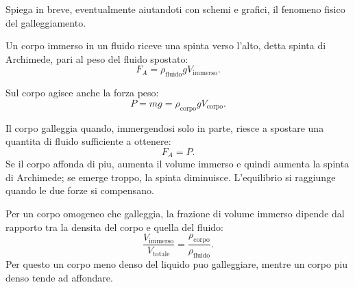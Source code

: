 
\begin{esercizio}
Spiega in breve, eventualmente aiutandoti con schemi e grafici, il fenomeno
fisico del galleggiamento.
\end{esercizio}

\begin{soluzione}
Un corpo immerso in un fluido riceve una spinta verso l'alto, detta spinta di
Archimede, pari al peso del fluido spostato:
\[
F_A=\rho_\text{fluido}gV_\text{immerso}.
\]

Sul corpo agisce anche la forza peso:
\[
P=mg=\rho_\text{corpo}gV_\text{corpo}.
\]

Il corpo galleggia quando, immergendosi solo in parte, riesce a spostare una
quantita di fluido sufficiente a ottenere:
\[
F_A=P.
\]
Se il corpo affonda di piu, aumenta il volume immerso e quindi aumenta la
spinta di Archimede; se emerge troppo, la spinta diminuisce. L'equilibrio si
raggiunge quando le due forze si compensano.

Per un corpo omogeneo che galleggia, la frazione di volume immerso dipende dal
rapporto tra la densita del corpo e quella del fluido:
\[
\frac{V_\text{immerso}}{V_\text{totale}}
=\frac{\rho_\text{corpo}}{\rho_\text{fluido}}.
\]
Per questo un corpo meno denso del liquido puo galleggiare, mentre un corpo piu
denso tende ad affondare.
\end{soluzione}
